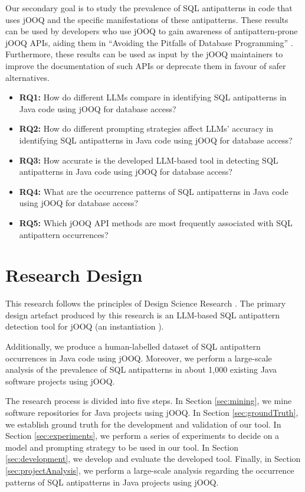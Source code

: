 \documentclass{article}
\begin{document}
Our secondary goal is to study the prevalence of SQL antipatterns in code that uses jOOQ and the specific manifestations of these antipatterns. These results can be used by developers who use jOOQ to gain awareness of antipattern-prone jOOQ APIs, aiding them in “Avoiding the Pitfalls of Database Programming” \cite{karwin2023sql}. Furthermore, these results can be used as input by the jOOQ maintainers to improve the documentation of such APIs or deprecate them in favour of safer alternatives.

\begin{itemize}
    \item \textbf{RQ1:} How do different LLMs compare in identifying SQL antipatterns in Java code using jOOQ for database access?
    \item \textbf{RQ2:} How do different prompting strategies affect LLMs' accuracy in identifying SQL antipatterns in Java code using jOOQ for database access?
    \item \textbf{RQ3:} How accurate is the developed LLM-based tool in detecting SQL antipatterns in Java code using jOOQ for database access?
    \item \textbf{RQ4:} What are the occurrence patterns of SQL antipatterns in Java code using jOOQ for database access?
    \item \textbf{RQ5:} Which jOOQ API methods are most frequently associated with SQL antipattern occurrences?
\end{itemize}

\section{Research Design}

This research follows the principles of Design Science Research \cite{hevner2004design}. The primary design artefact produced by this research is an LLM-based SQL antipattern detection tool for jOOQ (an instantiation \cite[p. 258]{march1995design}).

Additionally, we produce a human-labelled dataset of SQL antipattern occurrences in Java code using jOOQ. Moreover, we perform a large-scale analysis of the prevalence of SQL antipatterns in about 1,000 existing Java software projects using jOOQ.

The research process is divided into five steps. In Section \ref{sec:mining}, we mine software repositories for Java projects using jOOQ. In Section \ref{sec:groundTruth}, we establish ground truth for the development and validation of our tool. In Section \ref{sec:experiments}, we perform a series of experiments to decide on a model and prompting strategy to be used in our tool. In Section \ref{sec:development}, we develop and evaluate the developed tool. Finally, in Section \ref{sec:projectAnalysis}, we perform a large-scale analysis regarding the occurrence patterns of SQL antipatterns in Java projects using jOOQ.
\end{document}
